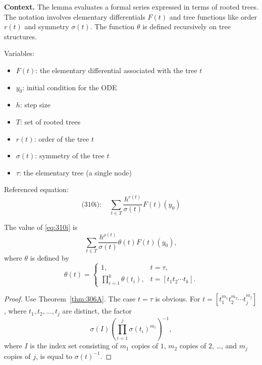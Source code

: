 \noindent\textbf{Context.}
The lemma evaluates a formal series expressed in terms of rooted trees. The notation involves elementary differentials $F(t)$ and tree functions like order $r(t)$ and symmetry $\sigma(t)$. The function $\theta$ is defined recursively on tree structures.

Variables:
\begin{itemize}
    \item $F(t)$: the elementary differential associated with the tree $t$
    \item $y_0$: initial condition for the ODE
    \item $h$: step size
    \item $T$: set of rooted trees
    \item $r(t)$: order of the tree $t$
    \item $\sigma(t)$: symmetry of the tree $t$
    \item $\tau$: the elementary tree (a single node)
\end{itemize}

Referenced equation:
\begin{equation}
    \text{(310i)}: \quad \sum_{t \in T} \frac{h^{r(t)}}{\sigma(t)} F(t)(y_0)
\end{equation}

\begin{lemma}

  \label{lem:310B}
The value of \eqref{eq:310i} is
\[
\sum_{t \in T} \frac{h^{\rho(t)}}{\sigma(t)} \theta(t) F(t)(y_0),
\]
where $\theta$ is defined by
\[
\theta(t) = 
\begin{cases}
1, & t = \tau, \\[4pt]
\displaystyle \prod_{i=1}^{k} \theta(t_i), & t = [t_1 t_2 \cdots t_k].
\end{cases}
\]
\end{lemma}

\begin{proof}
Use Theorem~\ref{thm:306A}. The case $t = \tau$ is obvious. For $t = [t_1^{m_1} t_2^{m_2} \cdots t_j^{m_j}]$, where $t_1, t_2, \dots, t_j$ are distinct, the factor
\[
\sigma(I) \left( \prod_{i=1}^{j} \sigma(t_i)^{m_i} \right)^{-1},
\]
where $I$ is the index set consisting of $m_1$ copies of $1$, $m_2$ copies of $2$, \dots, and $m_j$ copies of $j$, is equal to $\sigma(t)^{-1}$.
\end{proof}


